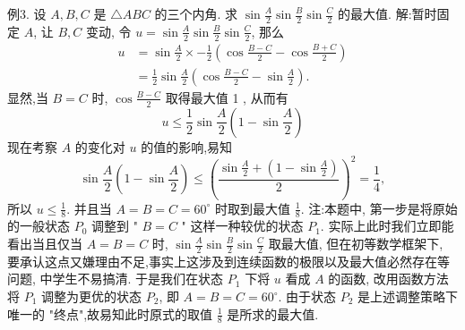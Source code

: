 例3. 设 $A, B, C$ 是 $\triangle A B C$ 的三个内角.
求 $\sin \frac{A}{2} \sin \frac{B}{2} \sin \frac{C}{2}$ 的最大值.
解:暂时固定 $A$, 让 $B, C$ 变动, 令 $u=\sin \frac{A}{2} \sin \frac{B}{2} \sin \frac{C}{2}$, 那么
$$
\begin{aligned}
u & =\sin \frac{A}{2} \times-\frac{1}{2}\left(\cos \frac{B-C}{2}-\cos \frac{B+C}{2}\right) \\
& =\frac{1}{2} \sin \frac{A}{2}\left(\cos \frac{B-C}{2}-\sin \frac{A}{2}\right) .
\end{aligned}
$$
显然,当 $B=C$ 时, $\cos \frac{B-C}{2}$ 取得最大值 1 , 从而有
$$
u \leqslant \frac{1}{2} \sin \frac{A}{2}\left(1-\sin \frac{A}{2}\right)
$$
现在考察 $A$ 的变化对 $u$ 的值的影响,易知
$$
\sin \frac{A}{2}\left(1-\sin \frac{A}{2}\right) \leqslant\left(\frac{\sin \frac{A}{2}+\left(1-\sin \frac{A}{2}\right)}{2}\right)^2=\frac{1}{4},
$$
所以 $u \leqslant \frac{1}{8}$. 并且当 $A=B=C=60^{\circ}$ 时取到最大值 $\frac{1}{8}$.
注:本题中, 第一步是将原始的一般状态 $P_0$ 调整到 " $B=C$ " 这样一种较优的状态 $P_1$. 实际上此时我们立即能看出当且仅当 $A=B=C$ 时, $\sin \frac{A}{2} \sin \frac{B}{2} \sin \frac{C}{2}$ 取最大值, 但在初等数学框架下, 要承认这点又嫌理由不足,事实上这涉及到连续函数的极限以及最大值必然存在等问题, 中学生不易搞清.
于是我们在状态 $P_1$ 下将 $u$ 看成 $A$ 的函数, 改用函数方法将 $P_1$ 调整为更优的状态 $P_2$, 即 $A=B=C=60^{\circ}$. 由于状态 $P_2$ 是上述调整策略下唯一的 "终点",故易知此时原式的取值 $\frac{1}{8}$ 是所求的最大值.



